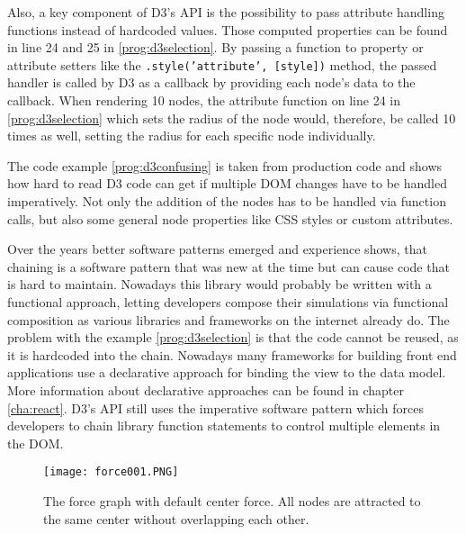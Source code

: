 Also, a key component of D3's API is the possibility to pass attribute handling functions instead of hardcoded values. Those computed properties can be found in line 24 and 25 in \ref{prog:d3selection}. By passing a function to property or attribute setters like the \texttt{.style('attribute', [style])} method, the passed handler is called by D3 as a callback by providing each node's data to the callback. When rendering 10 nodes, the attribute function on line 24 in \ref{prog:d3selection} which sets the radius of the node would, therefore, be called 10 times as well, setting the radius for each specific node individually.

The code example \ref{prog:d3confusing} is taken from production code and shows how hard to read D3 code can get if multiple DOM changes have to be handled imperatively. Not only the addition of the nodes has to be handled via function calls, but also some general node properties like CSS styles or custom attributes.

Over the years better software patterns emerged and experience shows, that chaining is a software pattern that was new at the time but can cause code that is hard to maintain. Nowadays this library would probably be written with a functional approach, letting developers compose their simulations via functional composition as various libraries and frameworks on the internet already do. The problem with the example \ref{prog:d3selection} is that the code cannot be reused, as it is hardcoded into the chain. Nowadays many frameworks for building front end applications use a declarative approach for binding the view to the data model. More information about declarative approaches can be found in chapter \ref{cha:react}. D3's API still uses the imperative software pattern which forces developers to chain library function statements to control multiple elements in the DOM.



\begin{figure}
  \centering
  \texttt{[image: force001.PNG]}
  \caption{The force graph with default center force. All nodes are attracted to the same center without overlapping each other.}
  \label{fig:force001}
\end{figure}

